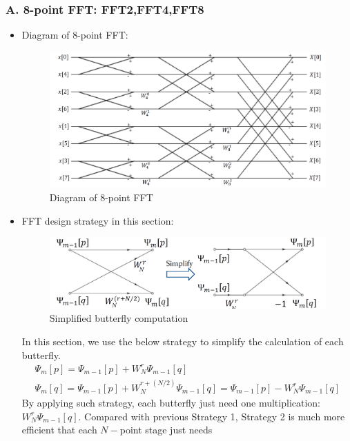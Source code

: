 \documentclass[onecolumn,oneside]{SUSTechHomework}
\begin{document}
\subsubsection*{A. 8-point FFT: FFT2,FFT4,FFT8}
\begin{itemize}
	\item Diagram of 8-point FFT:
	\begin{figure}[H]
		\centering
		\includegraphics[width=170mm]{pictures/8fft.png}
		\caption{Diagram of 8-point FFT}
	\end{figure}
	\item FFT design strategy in this section:
	\begin{figure}[H]
		\centering
		\includegraphics[width=170mm]{pictures/FFT_strategy.png}
		\caption{Simplified butterfly computation}
	\end{figure}
	In this section, we use the below strategy to simplify the calculation of each butterfly.
	\begin{equation}
		\begin{array}{c}\Psi_{m}[p]=\Psi_{m-1}[p]+W_{N}^{r} \Psi_{m-1}[q] 
			\\\Psi_{m}[q]=\Psi_{m-1}[p]+W_{N}^{r+(N / 2)} \Psi_{m-1}[q]=\Psi_{m-1}[p]-W_{N}^r\Psi_{m-1}[q]
		\end{array} \tag{Strategy 2}
	\end{equation}
	By applying such strategy, each butterfly just need one multiplication: $W_{N}^{r} \Psi_{m-1}[q]$.
	Compared with previous Strategy 1, Strategy 2 is much more efficient that each $N-$point stage just needs 

\end{itemize}
\end{document}
